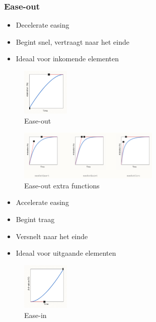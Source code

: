 \documentclass{article}
\begin{document}
\subsubsection{Ease-out}

\begin{itemize}
    \item Decelerate easing
    \item Begint snel, vertraagt naar het einde
    \item Ideaal voor inkomende elementen
\end{itemize}

\begin{figure}[H]
    \centering
    \includegraphics[width=0.2\textwidth]{animation-ease-out.png}
    \caption{Ease-out}
\end{figure}

\begin{figure}[H]
    \centering
    \includegraphics[width=0.6\textwidth]{animation-ease-out-extra.png}
    \caption{Ease-out extra functions}
\end{figure}

\begin{itemize}
    \item Accelerate easing
    \item Begint traag
    \item Versnelt naar het einde
    \item Ideaal voor uitgaande elementen
\end{itemize}

\begin{figure}[H]
    \centering
    \includegraphics[width=0.2\textwidth]{animation-ease-in.png}
    \caption{Ease-in}
\end{figure}
\end{document}
